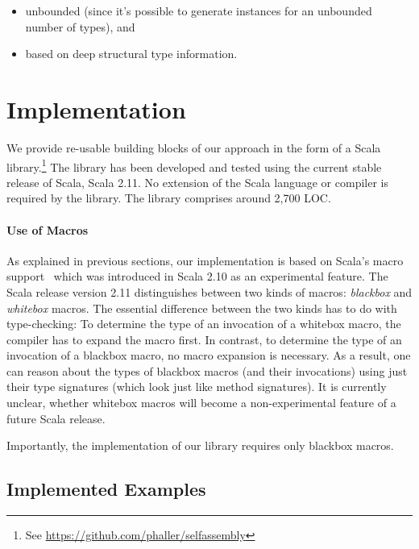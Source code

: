 \documentclass[preprint]{sigplanconf}
\begin{document}
\begin{itemize}
\item unbounded (since it’s possible to generate instances for an unbounded number of types), and
\item based on deep structural type information.
\end{itemize}

\section{Implementation}

We provide re-usable building blocks of our approach in the form of a Scala
library.\footnote{See \url{https://github.com/phaller/selfassembly}} The
library has been developed and tested using the current stable release of
Scala, Scala 2.11. No extension of the Scala language or compiler is required
by the library. The library comprises around 2,700 LOC.


\paragraph{Use of Macros} As explained in previous sections, our
implementation is based on Scala's macro support~\cite{Burmako2012} which was
introduced in Scala 2.10 as an experimental feature. The Scala release version
2.11 distinguishes between two kinds of macros: \emph{blackbox} and
\emph{whitebox} macros. The essential difference between the two kinds has to
do with type-checking: To determine the type of an invocation of a whitebox
macro, the compiler has to expand the macro first. In contrast, to determine
the type of an invocation of a blackbox macro, no macro expansion is
necessary. As a result, one can reason about the types of blackbox macros (and
their invocations) using just their type signatures (which look just like
method signatures). It is currently unclear, whether whitebox macros will
become a non-experimental feature of a future Scala release.

Importantly, the implementation of our library requires only blackbox macros.

\subsection{Implemented Examples}
\end{document}
